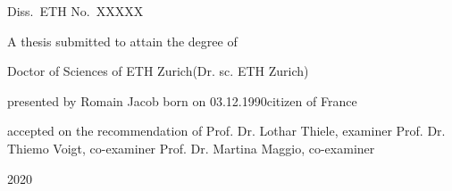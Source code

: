 
\newcommand{\dissnumstring}{XXXXX}

\newcommand{\degreestring}{Doctor of Sciences of ETH Zurich}
\newcommand{\degreestringabr}{(Dr. sc. ETH Zurich)}
\newcommand{\authorstring}{Romain Jacob}
\newcommand{\acatitlestring}{M.Sc. École Normale Supérieure de Cachan}
\newcommand{\dateofbirthstring}{03.12.1990}
\newcommand{\citizenstringA}{France}
\newcommand{\examinerstring}{Prof. Dr. Lothar Thiele}
\newcommand{\coexaminerstringA}{Prof. Dr. Thiemo Voigt}
\newcommand{\coexaminerstringB}{Prof. Dr. Martina Maggio}
\newcommand{\datestring}{2020}

\begin{titlepage}
{
\sffamily\setlength{\baselineskip}{10mm}

\begin{centerline}
{\large\noindent Diss.\ ETH No.\ \dissnumstring}
\end{centerline}
\vfill

\begin{center}
\LARGE\bfseries
\titlestringNOBR
\end{center}
\vfill

\begin{center}
\large A thesis submitted to attain the degree of
\end{center}
\vspace{0.55\fill}

\begin{center}
\large \degreestring \linebreak \degreestringabr
\end{center}
\vspace{0.55\fill}

\begin{center}
\large presented by \linebreak \authorstring %
\linebreak \linebreak born on \dateofbirthstring \linebreak citizen of
\citizenstringA
\end{center}
\vspace{3\fill}

\begin{center}
\large accepted on the recommendation of \linebreak
\examinerstring, examiner \linebreak
\coexaminerstringA, co-examiner \linebreak
\coexaminerstringB, co-examiner
\end{center}
\vspace{0.55\fill}

\begin{center}
\large{\datestring}
\end{center}
}
\end{titlepage}
